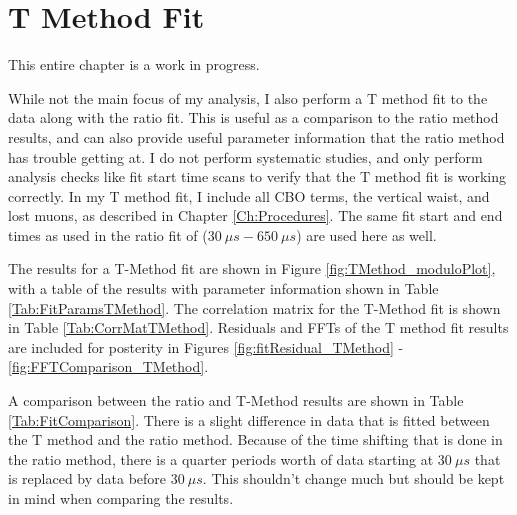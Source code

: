 \graphicspath{ {Figures/TMethod/Main/} {Figures/TMethod/ResidualsFFT/} {Figures/TMethod/Comparison/} {Figures/TMethod/RandomSeeds/} }

\chapter{T Method Fit}
\label{Ch:TMethod}

This entire chapter is a work in progress.


While not the main focus of my analysis, I also perform a T method fit to the data along with the ratio fit. This is useful as a comparison to the ratio method results, and can also provide useful parameter information that the ratio method has trouble getting at. I do not perform systematic studies, and only perform analysis checks like fit start time scans to verify that the T method fit is working correctly. In my T method fit, I include all CBO terms, the vertical waist, and lost muons, as described in Chapter \ref{Ch:Procedures}. The same fit start and end times as used in the ratio fit of ($\SI{30}{\mu s} - \SI{650}{\mu s}$) are used here as well.

The results for a T-Method fit are shown in Figure \ref{fig:TMethod_moduloPlot}, with a table of the results with parameter information shown in Table \ref{Tab:FitParamsTMethod}. The correlation matrix for the T-Method fit is shown in Table \ref{Tab:CorrMatTMethod}. Residuals and FFTs of the T method fit results are included for posterity in Figures \ref{fig:fitResidual_TMethod} - \ref{fig:FFTComparison_TMethod}.

A comparison between the ratio and T-Method results are shown in Table \ref{Tab:FitComparison}. There is a slight difference in data that is fitted between the T method and the ratio method. Because of the time shifting that is done in the ratio method, there is a quarter \gmtwo periods worth of data starting at $\SI{30}{\mu s}$ that is replaced by data before $\SI{30}{\mu s}$. This shouldn't change much but should be kept in mind when comparing the results.

